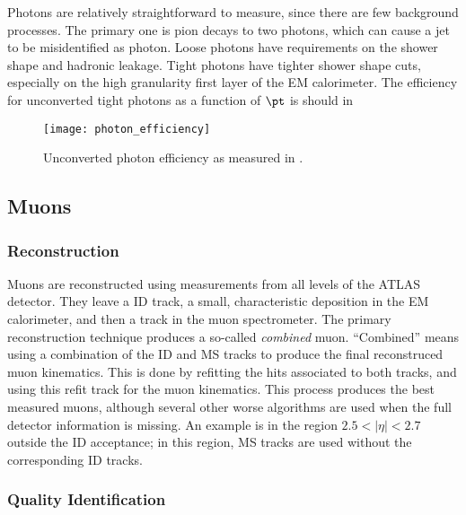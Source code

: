 Photons are relatively straightforward to measure, since there are few background processes\cite{ATL-PHYS-PUB-2016-015}.
The primary one is pion decays to two photons, which can cause a jet to be misidentified as photon.
Loose photons have requirements on the shower shape and hadronic leakage.
Tight photons have tighter shower shape cuts, especially on the high granularity first layer of the EM calorimeter.
The efficiency for unconverted tight photons as a function of $\pt$ is should in
\begin{figure}
\caption{Unconverted photon efficiency as measured in \cite{ATL-PHYS-PUB-2016-015}.} \label{fig:photon_eff}
\texttt{[image: photon\_efficiency]}
\end{figure}

\subsection{Muons}

\subsubsection{Reconstruction}

Muons are reconstructed using measurements from all levels of the ATLAS detector\cite{PERF-2015-10}.
They leave a ID track, a small, characteristic deposition in the EM calorimeter, and then a track in the muon spectrometer.
The primary reconstruction technique produces a so-called \textit{combined} muon.
``Combined'' means using a combination of the ID and MS tracks to produce the final reconstruced muon kinematics.
This is done by refitting the hits associated to both tracks, and using this refit track for the muon kinematics.
This process produces the best measured muons, although several other worse algorithms are used when the full detector information is missing.
An example is in the region $2.5 < |\eta| < 2.7$ outside the ID acceptance; in this region, MS tracks are used without the corresponding ID tracks.

\subsubsection{Quality Identification}

